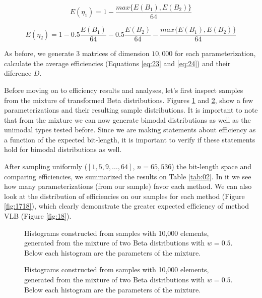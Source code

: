 \documentclass[10pt]{article}
\begin{document}
\begin{equation}\label{eq:23}
 E(\eta_1) = 1 - \frac{max\{E(B_1),E(B_2)\}}{64}
\end{equation}

\begin{equation}\label{eq:24}
 E(\eta_2) = 1 - 0.5\frac{E(B_1)}{64} - 0.5\frac{E(B_2)}{64} - \frac{max\{E(B_1),E(B_2)\}}{64}
\end{equation}
 
As before, we generate 3 matrices of dimension $10,000$ for each parameterization, calculate the average efficiencies (Equations \ref{eq:23} and \ref{eq:24}) and their diference $D$.

Before moving on to efficiency results and analyses, let's first inspect samples from the mixture of transformed Beta distributions. Figures \ref{fig:09101112} and \ref{fig:13141516}, show a few parameterizations and their resulting sample distributions. It is important to note that from the mixture we can now generate bimodal distributions as well as the unimodal types tested before. Since we are making statements about efficiency as a function of the expected bit-length, it is important to verify if these statements hold for bimodal  distributions as well.

After sampling uniformly ($[1,5,9,\ldots,64]$, $n=65,536$) the bit-length space and comparing efficiencies, we summarized the results on Table \ref{tab:02}. In it we see how many parameterizations (from our sample) favor each method. We can also look at the distribution of efficiencies on our samples for each method (Figure \ref{fig:1718}), which clearly demonstrate the greater expected efficiency of method VLB (Figure \ref{fig:18}).

\begin{figure}[h]
  \centering
  \subfigure[$\alpha_1=1,\beta_1=1,\alpha_2=1,\beta_2=1$]{
  }
  \subfigure[$\alpha_1=1,\beta_1=32,\alpha_2=32,\beta_2=1$]{
  }
  \subfigure[$\alpha_1=32,\beta_1=32,\alpha_2=32,\beta_2=32$]{
  }
  \subfigure[$\alpha_1=64,\beta_1=32,\alpha_2=32,\beta_2=64$]{
  }
  \caption{Histograms constructed from samples with 10,000 elements, generated from the mixture of two Beta distributions with $w=0.5$. Below each histogram are the parameters of the mixture.}
  \label{fig:09101112}
\end{figure}

\begin{figure}[h]
  \centering
  \subfigure[$\alpha_1=64,\beta_1=48,\alpha_2=1,\beta_2=48$]{
  }
  \subfigure[$\alpha_1=16,\beta_1=46,\alpha_2=49,\beta_2=64$]{
  }
  \subfigure[$\alpha_1=16,\beta_1=16,\alpha_2=16,\beta_2=49$]{
  }
  \subfigure[$\alpha_1=1,\beta_1=16,\alpha_2=1,\beta_2=49$]{
  }
  \caption{Histograms constructed from samples with 10,000 elements, generated from the mixture of two Beta distributions with $w=0.5$. Below each histogram are the parameters of the mixture.}
  \label{fig:13141516}
\end{figure}
\end{document}
